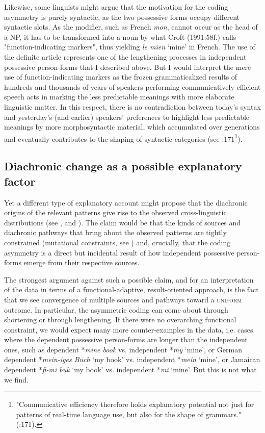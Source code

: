 \documentclass[output=paper]{langsci/langscibook}
\begin{document}
Likewise, some linguists might argue that the motivation for the coding asymmetry is purely syntactic, as the two possessive forms occupy different syntactic slots. As the modifier, such as French \textit{mon}, cannot occur as the head of a NP, it has to be transformed into a noun by what Croft (1991:58f.) calls "function-indicating markers", thus yielding \textit{le mien} `mine' in French. The use of the definite article represents one of the lengthening processes in independent possessive person-forms that I described above. But I would interpret the mere use of function-indicating markers as the frozen grammaticalized results of hundreds and thousands of years of speakers performing communicatively efficient speech acts in marking the less predictable meanings with more elaborate linguistic matter. In this respect, there is no contradiction between today's syntax and yesterday’s (and earlier) speakers' preferences to highlight less predictable meanings by more morphosyntactic material, which accumulated over generations and eventually contributes to the shaping of syntactic categories (see \citealt{NorcliffeJaeger2016}:171\footnote{"Communicative efficiency therefore holds explanatory potential not just for patterns of real-time language use, but also for the shape of grammars." (\citealt{NorcliffeJaeger2016}:171).}). 


\subsection{ Diachronic change as a possible explanatory factor}

Yet a different type of explanatory account might propose that the diachronic origins of the relevant patterns give rise to the observed cross-linguistic distributions (see \citealt{Cristofaro2017}, and ). The claim would be that the kinds of sources and diachronic pathways that bring about the observed patterns are tightly constrained (mutational constraints, see ) and, crucially, that the coding asymmetry is a direct but incidental result of how independent possessive person-forms emerge from their respective sources. 

The strongest argument against such a possible claim, and for an interpretation of the data in terms of a functional-adaptive, result-oriented approach, is the fact that we see convergence of multiple sources and pathways toward a \textsc{uniform} outcome. In particular, the asymmetric coding can come about through shortening or through lengthening. If there were no overarching functional constraint, we would expect many more counter-examples in the data, i.e. cases where the dependent possessive person-forms are longer than the independent ones, such as dependent *\textit{mine book} vs. independent *\textit{my} `mine', or German dependent *\textit{mein-iges Buch} `my book' vs. independent *\textit{mein} `mine', or Jamaican dependent *\textit{fi-mi buk} `my book' vs. independent *\textit{mi} `mine'. But this is not what we find.
\end{document}
